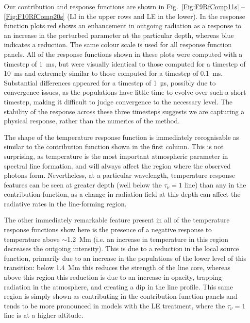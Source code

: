 Our contribution and response functions are shown in Fig.~\ref{Fig:F9RfComp11s} -- \ref{Fig:F10RfComp20s} (LI in the upper rows and LE in the lower).
In the response function plots red shows an enhancement in outgoing radiation as a response to an increase in the perturbed parameter at the particular depth, whereas blue indicates a reduction.
The same colour scale is used for all response function panels.
All of the response functions shown in these plots were computed with a timestep of \SI{1}{\milli\second}, but were visually identical to those computed for a timestep of \SI{10}{\milli\second} and extremely similar to those computed for a timestep of \SI{0.1}{\milli\second}.
Substantial differences appeared for a timestep of \SI{1}{\micro\s}, possibly due to convergence issues, as the populations have little time to evolve over such a short timestep, making it difficult to judge convergence to the necessary level.
The stability of the response across these three timesteps suggests we are capturing a physical response, rather than the numerics of the method.

The shape of the temperature response function is immediately recognisable as similar to the contribution function shown in the first column.
This is not surprising, as temperature is the most important atmospheric parameter in spectral line formation, and will always affect the region where the observed photons form.
Nevertheless, at a particular wavelength, temperature response features can be seen at greater depth (well below the $\tau_\nu=1$ line) than any in the contribution function, as a change in radiation field at this depth can affect the radiative rates in the line-forming region.

The other immediately remarkable feature present in all of the temperature response functions show here is the presence of a negative response to temperature above $\sim$\SI{1.2}{\mega\metre} (i.e. an increase in temperature in this region decreases the outgoing intensity).
This is due to a reduction in the local source function, primarily due to an increase in the populations of the lower level of this transition: below \SI{1.4}{\mega\m} this reduces the strength of the line core, whereas above this region this reduction is due to an increase in opacity, trapping radiation in the atmosphere, and creating a dip in the line profile.
This same region is simply shown as contributing in the contribution function panels and tends to be more pronounced in models with the LE treatment, where the $\tau_\nu=1$ line is at a higher altitude.


